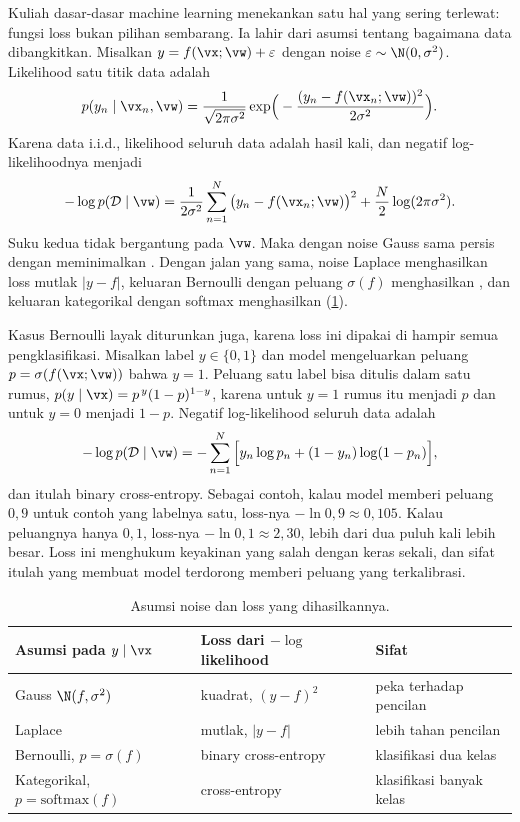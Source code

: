 Kuliah dasar-dasar machine learning menekankan satu hal yang sering terlewat: fungsi loss bukan
pilihan sembarang. Ia lahir dari asumsi tentang bagaimana data dibangkitkan. Misalkan
$y=f(\vx;\vw)+\varepsilon$ dengan noise $\varepsilon\sim\N(0,\sigma^2)$. Likelihood satu titik data
adalah
\[
p(y_n\mid\vx_n,\vw)=\frac{1}{\sqrt{2\pi\sigma^2}}\exp\!\Big(-\frac{(y_n-f(\vx_n;\vw))^2}{2\sigma^2}\Big).
\]
Karena data i.i.d., likelihood seluruh data adalah hasil kali, dan negatif log-likelihoodnya
menjadi
\begin{equation}
-\log p(\mathcal{D}\mid\vw)=\frac{1}{2\sigma^2}\sum_{n=1}^N\big(y_n-f(\vx_n;\vw)\big)^2+\frac N2\log(2\pi\sigma^2).
\end{equation}
Suku kedua tidak bergantung pada $\vw$. Maka  dengan noise Gauss sama
persis dengan meminimalkan . Dengan jalan yang sama, noise Laplace
menghasilkan loss mutlak $|y-f|$, keluaran Bernoulli dengan peluang $\sigma(f)$ menghasilkan
, dan keluaran kategorikal dengan softmax menghasilkan
 (\cref{tab:noiseloss}).

Kasus Bernoulli layak diturunkan juga, karena loss ini dipakai di hampir semua pengklasifikasi.
Misalkan label $y\in\{0,1\}$ dan model mengeluarkan peluang $p=\sigma(f(\vx;\vw))$ bahwa $y=1$. Peluang
satu label bisa ditulis dalam satu rumus, $p(y\mid\vx)=p^{\,y}(1-p)^{1-y}$, karena untuk $y=1$ rumus itu
menjadi $p$ dan untuk $y=0$ menjadi $1-p$. Negatif log-likelihood seluruh data adalah
\begin{equation}
-\log p(\mathcal D\mid\vw)=-\sum_{n=1}^N\Big[y_n\log p_n+(1-y_n)\log(1-p_n)\Big],
\end{equation}
dan itulah binary cross-entropy. Sebagai contoh, kalau model memberi peluang $0{,}9$ untuk contoh yang
labelnya satu, loss-nya $-\ln0{,}9\approx0{,}105$. Kalau peluangnya hanya $0{,}1$, loss-nya
$-\ln0{,}1\approx2{,}30$, lebih dari dua puluh kali lebih besar. Loss ini menghukum keyakinan yang
salah dengan keras sekali, dan sifat itulah yang membuat model terdorong memberi peluang yang
terkalibrasi.

\begin{table}[ht]
\centering\small
\caption{Asumsi noise dan loss yang dihasilkannya.}
\label{tab:noiseloss}
\begin{tabular}{@{}lll@{}}
\toprule
Asumsi pada $y\mid\vx$ & Loss dari $-\log$ likelihood & Sifat \\
\midrule
Gauss $\N(f,\sigma^2)$ & kuadrat, $(y-f)^2$ & peka terhadap pencilan \\
Laplace & mutlak, $|y-f|$ & lebih tahan pencilan \\
Bernoulli, $p=\sigma(f)$ & binary cross-entropy & klasifikasi dua kelas \\
Kategorikal, $p=\mathrm{softmax}(f)$ & cross-entropy & klasifikasi banyak kelas \\
\bottomrule
\end{tabular}
\end{table}

